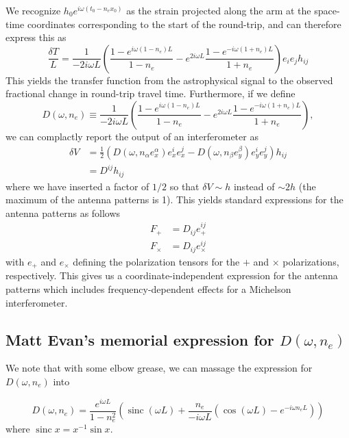\documentclass{article}
\DeclareMathOperator{\sinc}{sinc}
\begin{document}
We recognize $h_0 e^{i\omega(t_0-n_ex_0)}$ as the strain projected along the arm at the space-time coordinates corresponding to the start of the round-trip, and can therefore express this as
\begin{equation}
    \frac{\delta T}{L} = \frac{1}{-2i\omega L} \left(\frac{1-e^{i\omega(1-n_e)L}}{1-n_e} - e^{2i\omega L}\frac{1-e^{-i\omega(1+n_e)L}}{1+n_e} \right) e_i e_j h_{ij}
\end{equation}
This yields the transfer function from the astrophysical signal to the observed fractional change in round-trip travel time. 
Furthermore, if we define
\begin{equation}
    D(\omega, n_e) \equiv \frac{1}{-2i\omega L} \left(\frac{1-e^{i\omega(1-n_e)L}}{1-n_e} - e^{2i\omega L}\frac{1-e^{-i\omega(1+n_e)L}}{1+n_e} \right),
\end{equation}
we can complactly report the output of an interferometer as
\begin{align}
    \delta V & = \frac{1}{2}\left( D(\omega, n_\alpha e_x^\alpha) e_x^i e_x^j - D(\omega, n_\beta e_y^\beta) e_y^i e_y^j \right) h_{ij} \\
             & = D^{ij} h_{ij}
\end{align}
where we have inserted a factor of $1/2$ so that $\delta V\sim h$ instead of $\sim 2h$ (the maximum of the antenna patterns is 1).
This yields standard expressions for the antenna patterns as follows
\begin{align}
    F_+ & = D_{ij} e_+^{ij} \\
    F_\times & = D_{ij} e_\times^{ij}
\end{align}
with $e_+$ and $e_\times$ defining the polarization tensors for the $+$ and $\times$ polarizations, respectively.
This gives us a coordinate-independent expression for the antenna patterns which includes frequency-dependent effects for a Michelson interferometer.

\subsection*{Matt Evan's memorial expression for $D(\omega, n_e)$}

We note that with some elbow grease, we can massage the expression for $D(\omega, n_e)$ into

\begin{equation}
    D(\omega, n_e) = \frac{e^{i\omega L}}{1-n_e^2}\left( \sinc(\omega L) + \frac{n_e}{-i\omega L} \left( \cos(\omega L) - e^{-i\omega n_e L}\right)\right)
\end{equation}
where $\sinc x = x^{-1} \sin x$.
\end{document}

